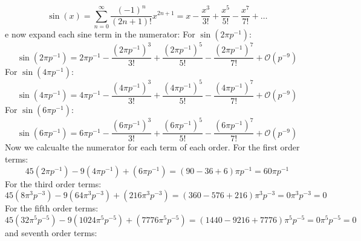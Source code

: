 \begin{equation}
	\sin(x) = \sum_{n=0}^{\infty} \frac{(-1)^n}{(2n + 1)!}x^{2n+1} = x - \frac{x^3}{3!} + \frac{x^5}{5!} - \frac{x^7}{7!} + \ldots \tag{30}
\end{equation}
e now expand each sine term in the numerator:
For $\sin(2\pi p^{-1})$:
\begin{equation}
	\sin(2\pi p^{-1}) = 2\pi p^{-1} - \frac{(2\pi p^{-1})^3}{3!} + \frac{(2\pi p^{-1})^5}{5!} - \frac{(2\pi p^{-1})^7}{7!} + \mathcal{O}(p^{-9})
\end{equation}
For $\sin(4\pi p^{-1})$:
\begin{equation}
	\sin(4\pi p^{-1}) = 4\pi p^{-1} - \frac{(4\pi p^{-1})^3}{3!} + \frac{(4\pi p^{-1})^5}{5!} - \frac{(4\pi p^{-1})^7}{7!} + \mathcal{O}(p^{-9})
\end{equation}
For $\sin(6\pi p^{-1})$:
\begin{equation}
	\sin(6\pi p^{-1}) = 6\pi p^{-1} - \frac{(6\pi p^{-1})^3}{3!} + \frac{(6\pi p^{-1})^5}{5!} - \frac{(6\pi p^{-1})^7}{7!} + \mathcal{O}(p^{-9})
\end{equation}
Now we calcualte the numerator for each term of each order.\newline
For the first order terms:
\begin{equation}
	45\left( 2 \pi p^{-1}\right) - 9\left(4 \pi p^{-1}\right) + \left(6 \pi p^{-1}\right) = (90 - 36 + 6) \pi p^{-1} = 60 \pi p^{-1}
\end{equation}
For the third order terms:
\begin{equation}
	45\left( 8 \pi^3 p^{-3}\right) - 9\left(64 \pi^3 p^{-3}\right) + \left(216 \pi^3 p^{-3}\right) = (360 - 576 + 216) \pi^3 p^{-3} = 0 \pi^3 p^{-3} = 0
\end{equation}
For the fifth order terms:
\begin{equation}
	45\left( 32 \pi^5 p^{-5}\right) - 9\left(1024 \pi^5 p^{-5}\right) + \left(7776 \pi^5 p^{-5}\right) = (1440 - 9216 + 7776) \pi^5 p^{-5} = 0 \pi^5 p^{-5} = 0
\end{equation}
and seventh order terms:

